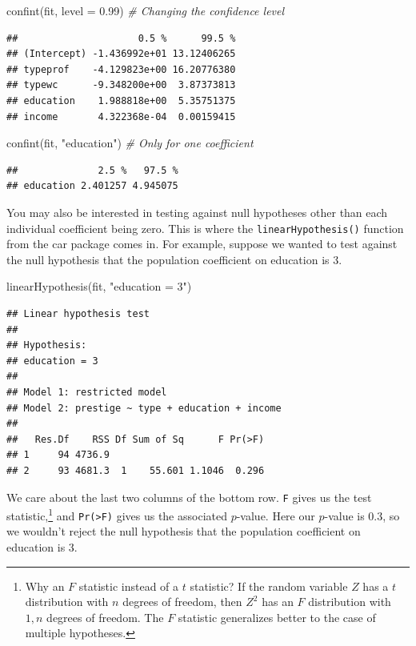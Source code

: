 \documentclass[
  12pt,
  oneside,openany]{book}
\newenvironment{Shaded}{\begin{snugshade}}{\end{snugshade}}
\newcommand{\AttributeTok}[1]{\textcolor[rgb]{0.77,0.63,0.00}{#1}}
\newcommand{\CommentTok}[1]{\textcolor[rgb]{0.56,0.35,0.01}{\textit{#1}}}
\newcommand{\FloatTok}[1]{\textcolor[rgb]{0.00,0.00,0.81}{#1}}
\newcommand{\FunctionTok}[1]{\textcolor[rgb]{0.00,0.00,0.00}{#1}}
\newcommand{\NormalTok}[1]{#1}
\newcommand{\StringTok}[1]{\textcolor[rgb]{0.31,0.60,0.02}{#1}}
\begin{document}
\begin{Shaded}
\begin{Highlighting}[]
\FunctionTok{confint}\NormalTok{(fit, }\AttributeTok{level =} \FloatTok{0.99}\NormalTok{)  }\CommentTok{\# Changing the confidence level}
\end{Highlighting}
\end{Shaded}

\begin{verbatim}
##                     0.5 %      99.5 %
## (Intercept) -1.436992e+01 13.12406265
## typeprof    -4.129823e+00 16.20776380
## typewc      -9.348200e+00  3.87373813
## education    1.988818e+00  5.35751375
## income       4.322368e-04  0.00159415
\end{verbatim}

\begin{Shaded}
\begin{Highlighting}[]
\FunctionTok{confint}\NormalTok{(fit, }\StringTok{"education"}\NormalTok{)   }\CommentTok{\# Only for one coefficient}
\end{Highlighting}
\end{Shaded}

\begin{verbatim}
##              2.5 %   97.5 %
## education 2.401257 4.945075
\end{verbatim}

You may also be interested in testing against null hypotheses other than each individual coefficient being zero. This is where the \texttt{linearHypothesis()} function from the car package comes in. For example, suppose we wanted to test against the null hypothesis that the population coefficient on education is 3.

\begin{Shaded}
\begin{Highlighting}[]
\FunctionTok{linearHypothesis}\NormalTok{(fit, }\StringTok{"education = 3"}\NormalTok{)}
\end{Highlighting}
\end{Shaded}

\begin{verbatim}
## Linear hypothesis test
## 
## Hypothesis:
## education = 3
## 
## Model 1: restricted model
## Model 2: prestige ~ type + education + income
## 
##   Res.Df    RSS Df Sum of Sq      F Pr(>F)
## 1     94 4736.9                           
## 2     93 4681.3  1    55.601 1.1046  0.296
\end{verbatim}

We care about the last two columns of the bottom row. \texttt{F} gives us the test statistic,\footnote{Why an \(F\) statistic instead of a \(t\) statistic? If the random variable \(Z\) has a \(t\) distribution with \(n\) degrees of freedom, then \(Z^2\) has an \(F\) distribution with \(1,n\) degrees of freedom. The \(F\) statistic generalizes better to the case of multiple hypotheses.} and \texttt{Pr(\textgreater{}F)} gives us the associated \(p\)-value. Here our \(p\)-value is 0.3, so we wouldn't reject the null hypothesis that the population coefficient on education is 3.
\end{document}

